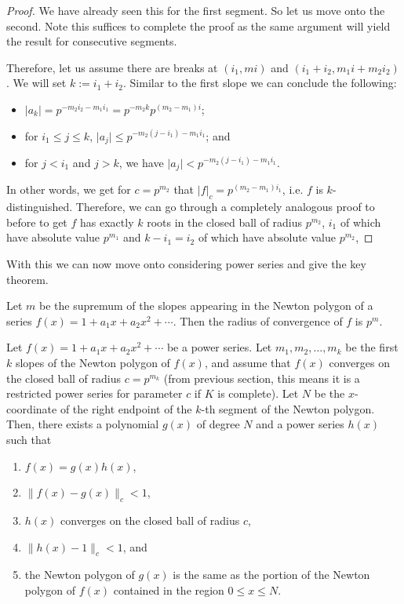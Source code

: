 \begin{proof}
  We have already seen this for the first segment. So let us move onto the second. Note this suffices
  to complete the proof as the same argument will yield the result for consecutive segments.

  Therefore, let us assume there are breaks at $(i_1,mi)$ and $(i_1 + i_2, m_1 i + m_2 i_2)$. We
  will set $k := i_1 + i_2$. Similar to the first slope we can conclude the following:
  \begin{itemize}
    \item $\lvert a_k \rvert = p^{-m_2 i_2 - m_1 i_1} = p^{-m_2 k} p^{(m_2 - m_1)i}$;
    \item for $i_1 \leq j \leq k$, $\lvert a_j \rvert \leq p^{-m_2 (j - i_1) - m_1 i_1}$; and
    \item for $j < i_1$ and $ j > k$, we have $\lvert a_j \rvert < p^{-m_2 (j - i_1)- m_1 i_1}.$
  \end{itemize}
  In other words, we get for $c = p^{m_2}$ that $\lvert f \rvert_c = p^{(m_2 - m_1)i_1}$, i.e. $f$
  is $k$-distinguished. Therefore, we can go through a completely analogous proof to before to get
  $f$ has exactly $k$ roots in the closed ball of radius $p^{m_2}$, $i_1$ of which have absolute
  value $p^{m_1}$ and $k-i_1 = i_2$ of which have absolute value $p^{m_2}$,
\end{proof}

With this we can now move onto considering power series and give the key theorem.

\begin{theorem} \label{RadofCon}
    Let $m$ be the supremum of the slopes appearing in the Newton polygon of a series
    $f(x) = 1 + a_1 x + a_2 x^2 + \cdots$. Then the radius of convergence of $f$ is $p^m.$
\end{theorem}

\begin{proposition}\label{NP}
    Let $f(x) = 1 + a_1 x + a_2 x^2 + \cdots$ be a power series. Let $m_1, m_2, \dots, m_k$ be the
    first $k$ slopes of the Newton polygon of $f(x)$, and assume that $f(x)$ converges on the
    closed ball of radius $c = p^{m_k}$ (from previous section, this means it is a restricted power
    series for parameter $c$ if $K$ is complete). Let $N$ be the $x$-coordinate of the right
    endpoint of the $k$-th segment of the Newton polygon. Then, there exists a polynomial
    $g(x)$ of degree $N$ and a power series $h(x)$ such that
    \begin{enumerate}
        \item $f(x) = g(x) h(x)$,
        \item $\| f(x) - g(x) \|_c < 1$,
        \item $h(x)$ converges on the closed ball of radius $c$,
        \item $\| h(x) - 1\|_c <1$, and
        \item the Newton polygon of $g(x)$ is the same as the portion of the Newton polygon of
        $f(x)$ contained in the region $0 \leq x \leq N$.
    \end{enumerate}
\end{proposition}

